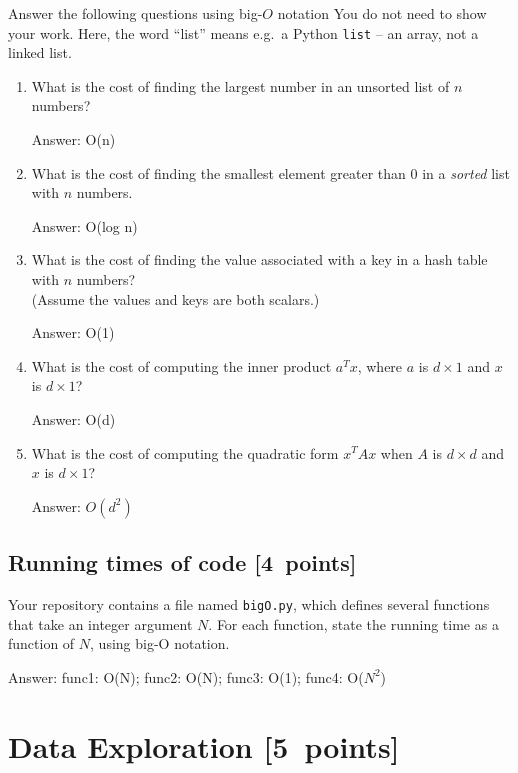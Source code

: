 \documentclass{article}
\newcommand{\blu}[1]{{\textcolor{blu}{#1}}}
\newenvironment{answer}{\par\begingroup\color{gre}Answer: }{\endgroup}
\let\ask\blu
\newcommand\pts[1]{\textcolor{pointscolour}{[#1~points]}}
\begin{document}
  \ask{Answer the following questions using big-$O$ notation} You do not need to show your work.
  Here, the word ``list'' means e.g.\ a Python \texttt{list} -- an array, not a linked list.
  \begin{enumerate}
  \item What is the cost of finding the largest number in an unsorted list of $n$ numbers?
  \begin{answer}
    O(n)
  \end{answer}
  \item What is the cost of finding the smallest element greater than 0 in a \emph{sorted} list with $n$ numbers.
  \begin{answer}
    O(log n)
  \end{answer}
  \item What is the cost of finding the value associated with a key in a hash table with $n$ numbers? \\(Assume the values and keys are both scalars.)
  \begin{answer}
    O(1)
  \end{answer}
  \item What is the cost of computing the inner product $a^Tx$, where $a$ is $d \times 1$ and $x$ is $d \times 1$?
  \begin{answer}
    O(d)
  \end{answer}
  \item What is the cost of computing the quadratic form $x^TAx$ when $A$ is $d \times d$ and $x$ is $d \times 1$?
  \begin{answer}
    $O(d^2)$
  \end{answer}
  \end{enumerate}

  \subsection{Running times of code \pts{4}}

  Your repository contains a file named \texttt{bigO.py}, which defines several functions
  that take an integer argument $N$. For each function, \ask{state the running time as a function of $N$, using big-O notation}.
  \begin{answer}
    func1: O(N); 
    func2: O(N); 
    func3: O(1); 
    func4: O($N^2$)
  \end{answer}


  \clearpage
  \section{Data Exploration \pts{5}}
\end{document}
